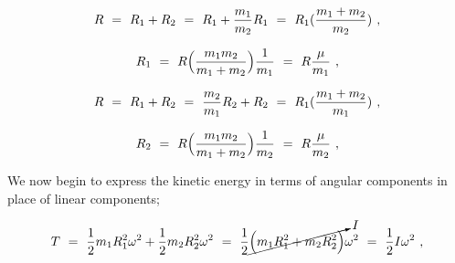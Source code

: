 \documentclass{article}
\begin{document}
\begin{equation} \label{eq:256}
R \hspace{0.125cm} = \hspace{0.125cm} R_1 + R_2 \hspace{0.125cm} = \hspace{0.125cm} R_1 + \frac{m_1}{m_2} R_1 \hspace{0.125cm} = \hspace{0.125cm} R_1 (\frac{m_1 + m_2}{m_2} ) \hspace{0.125cm} , 
\end{equation}

\begin{equation} \label{eq:256}
R_1 \hspace{0.125cm} = \hspace{0.125cm} R \Big( \frac{m_1 m_2}{m_1 + m_2} \Big) \frac{1}{m_1} \hspace{0.125cm} = \hspace{0.125cm} R \frac{\mu}{m_1} \hspace{0.125cm} , 
\end{equation}

\begin{equation} \label{eq:256}
R \hspace{0.125cm} = \hspace{0.125cm} R_1 + R_2 \hspace{0.125cm} = \hspace{0.125cm} \frac{m_2}{m_1} R_2 + R_2 \hspace{0.125cm} = \hspace{0.125cm} R_1 (\frac{m_1 + m_2}{m_1} ) \hspace{0.125cm} , 
\end{equation}

\begin{equation} \label{eq:256}
R_2 \hspace{0.125cm} = \hspace{0.125cm} R \Big( \frac{m_1 m_2}{m_1 + m_2} \Big) \frac{1}{m_2} \hspace{0.125cm} = \hspace{0.125cm} R \frac{\mu}{m_2} \hspace{0.125cm} , 
\end{equation}

We now begin to express the kinetic energy in terms of angular components in place of linear components; 

\begin{equation} \label{eq:256}
T \hspace{0.125cm} = \hspace{0.125cm} \frac{1}{2} m_1 R^{2}_{1} \omega^{2} + \frac{1}{2} m_2 R^{2}_{2} \omega^{2} \hspace{0.125cm} = \hspace{0.125cm} \frac{1}{2} \cancelto{I}{\Big( m_1 R^{2}_{1} + m_2 R^{2}_{2} \Big)} \omega^{2} \hspace{0.125cm} = \hspace{0.125cm} \frac{1}{2} I \omega^{2} \hspace{0.125cm} , 
\end{equation}
\end{document}
